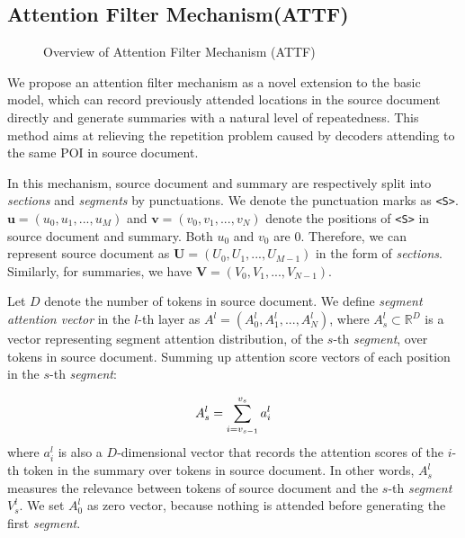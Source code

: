 \subsection{Attention Filter Mechanism(ATTF)}
\label{sec:attf}

\begin{figure}[th]
	\centering
	\caption{Overview of Attention Filter Mechanism (ATTF)}
	\label{fig:model_main}
\end{figure}


\label{sec:attnf}
We propose an attention filter mechanism as a novel extension 
to the basic model,
which can record previously attended locations 
in the source document directly and generate summaries 
with a natural level of repeatedness. 
This method aims at relieving the repetition problem caused by 
decoders attending to the same POI in source document.

In this mechanism, source document and summary are respectively split into 
\textit{sections} and \textit{segments} by punctuations. We
denote the punctuation marks as \verb#<S>#.
$\mathbf{u}=(u_{0},u_{1},...,u_{M})$ 
and $\mathbf{v}=(v_{0},v_{1},...,v_{N})$
denote the positions of \verb#<S># in source document and summary.
Both $u_{0}$ and $v_{0}$ are $0$.
Therefore, we can represent source document as $\mathbf{U}=(U_{0},U_{1},...,U_{M-1})$ in the form of \textit{sections}. Similarly, for summaries, we have $\mathbf{V}=(V_{0},V_{1},...,V_{N-1})$.

Let $D$ denote the number of tokens in source document.
We define \textit{segment attention vector} in the $l$-th layer as 
$A^{l} = (A_{0}^{l}, A_{1}^{l},..., A_{N}^{l})$, 
where $A_s^l\subset \mathbb{R}^{D}$ is a vector representing 
segment attention distribution, of the $s$-th \textit{segment},
over tokens in source document. Summing up attention score vectors 
of each position in the $s$-th \textit{segment}:

\begin{equation}
\small
    A_{s}^{l} = \sum_{i=v_{s-1}}^{v_{s}}a_{i}^{l}
\end{equation}
where $a_i^l$ is also a $D$-dimensional vector that records 
the attention scores of the $i$-th token in the summary over 
tokens in source document. In other words, $ A_{s}^{l}$ 
measures the relevance between tokens of source document and 
the $s$-th \textit{segment} $V_s^{l}$.
We set $A_{0}^{l}$ as zero vector, because nothing is attended before generating the first \textit{segment}. 


